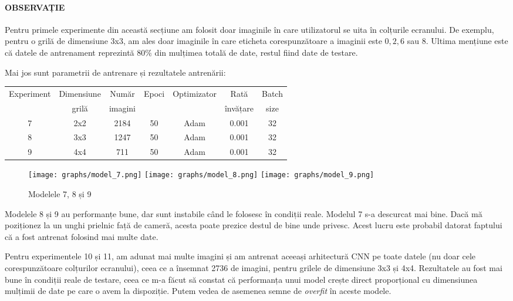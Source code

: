 \paragraph{OBSERVAȚIE}
Pentru primele experimente din această secțiune am folosit doar imaginile în care utilizatorul se uita în colțurile ecranului.
De exemplu, pentru o grilă de dimensiune 3x3, am ales doar imaginile în care eticheta corespunzătoare a imaginii este $0, 2, 6$ sau $8$.
Ultima mențiune este că datele de antrenament reprezintă $80\%$ din mulțimea totală de date, restul fiind date de testare.


Mai jos sunt parametrii de antrenare și rezultatele antrenării:

\begin{center}
    \begin{tabular}{ c | c | c | c | c | c | c }
        \hline
        Experiment & Dimensiune & Număr   & Epoci & Optimizator & Rată     & Batch \\ 
                   & grilă      & imagini &       &             & învățare & size  \\ 
        \hline
        7 & 2x2 & 2184 & 50 & Adam & 0.001 & 32 \\
        \hline
        8 & 3x3 & 1247 & 50 & Adam & 0.001 & 32 \\
        \hline
        9 & 4x4 & 711 & 50 & Adam & 0.001 & 32 \\
        \hline
    \end{tabular}
\end{center}

\begin{figure}[h]
    \centering
    \texttt{[image: graphs/model\_7.png]}
    \texttt{[image: graphs/model\_8.png]}
    \texttt{[image: graphs/model\_9.png]}
    \caption{Modelele 7, 8 și 9}
\end{figure}

Modelele 8 și 9 au performanțe bune, dar sunt instabile când le folosesc în condiții reale.
Modelul 7 s-a descurcat mai bine.
Dacă mă poziționez la un unghi prielnic față de cameră, acesta poate prezice destul de bine unde privesc.
Acest lucru este probabil datorat faptului că a fost antrenat folosind mai multe date.

Pentru experimentele 10 și 11, am adunat mai multe imagini și am antrenat aceeași arhitectură CNN pe toate datele (nu doar cele corespunzătoare colțurilor ecranului), ceea ce a însemnat 2736 de imagini, pentru grilele de dimensiune 3x3 și 4x4.
Rezultatele au fost mai bune în condiții reale de testare, ceea ce m-a făcut să constat că performanța unui model crește direct proporțional cu dimensiunea mulțimii de date pe care o avem la dispoziție.
Putem vedea de asemenea semne de \emph{overfit} în aceste modele.

